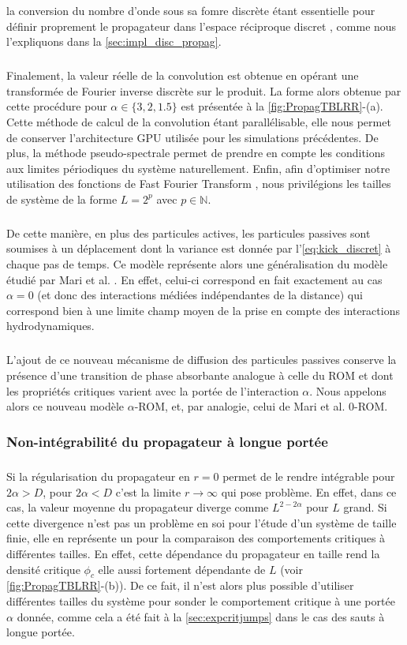\noindent la conversion du nombre d'onde sous sa fomre discrète étant essentielle pour définir proprement le propagateur dans l'espace réciproque discret \cite{ferrero_criticality_2019, rossi_finite-disorder_2022}, comme nous l'expliquons dans la \autoref{sec:impl_disc_propag}.

\subparagraph{}Finalement, la valeur réelle de la convolution est obtenue en opérant une transformée de Fourier inverse discrète sur le produit. La forme alors obtenue par cette procédure pour $\alpha \in \{ 3, 2, 1.5 \}$ est présentée à la \autoref{fig:PropagTBLRR}-(a). Cette méthode de calcul de la convolution étant parallélisable, elle nous permet de conserver l'architecture GPU utilisée pour les simulations précédentes. De plus, la méthode pseudo-spectrale permet de prendre en compte les conditions aux limites périodiques du système naturellement. Enfin, afin d'optimiser notre utilisation des fonctions de Fast Fourier Transform \cite{cooley_algorithm_1965}, nous privilégions les tailles de système de la forme $L = 2^p$ avec $p \in \mathbb{N}$.

\subparagraph{}De cette manière, en plus des particules actives, les particules passives sont soumises à un déplacement dont la variance est donnée par l'\autoref{eq:kick_discret} à chaque pas de temps. Ce modèle représente alors une généralisation du modèle étudié par Mari et al. \cite{mari_absorbing_2022}. En effet, celui-ci correspond en fait exactement au cas $\alpha = 0$ (et donc des interactions médiées indépendantes de la distance) qui correspond bien à une limite champ moyen de la prise en compte des interactions hydrodynamiques.

\subparagraph{}L'ajout de ce nouveau mécanisme de diffusion des particules passives conserve la présence d'une transition de phase absorbante analogue à celle du ROM et dont les propriétés critiques varient avec la portée de l'interaction $\alpha$. Nous appelons alors ce nouveau modèle $\alpha$-ROM, et, par analogie, celui de Mari et al. 0-ROM. 

\subsubsection{Non-intégrabilité du propagateur à longue portée}

\label{sec:noninteg}

\subparagraph{}Si la régularisation du propagateur en $r=0$ permet de le rendre intégrable pour $2\alpha > D$, pour $2\alpha<D$ c'est la limite $r\rightarrow\infty$ qui pose problème. En effet, dans ce cas, la valeur moyenne du propagateur diverge comme $L^{2-2\alpha}$ pour $L$ grand. Si cette divergence n'est pas un problème en soi pour l'étude d'un système de taille finie, elle en représente un pour la comparaison des comportements critiques à différentes tailles. En effet, cette dépendance du propagateur en taille rend la densité critique $\phi_c$ elle aussi fortement dépendante de $L$ (voir \autoref{fig:PropagTBLRR}-(b)). De ce fait, il n'est alors plus possible d'utiliser différentes tailles du système pour sonder le comportement critique à une portée $\alpha$ donnée, comme cela a été fait à la \autoref{sec:expcritjumps} dans le cas des sauts à longue portée.


